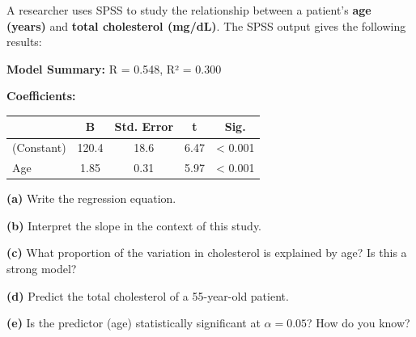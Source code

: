 \documentclass[
  12pt,
  letterpaper,
]{book}
\newcounter{none} %
\begin{document}
\begin{tcolorbox}[enhanced jigsaw, arc=.35mm, bottomrule=.15mm, bottomtitle=1mm, breakable, colback=white, colbacktitle=quarto-callout-caution-color!10!white, colframe=quarto-callout-caution-color-frame, coltitle=black, left=2mm, leftrule=.75mm, opacityback=0, opacitybacktitle=0.6, rightrule=.15mm, title={✏️ Exercise 2}, titlerule=0mm, toprule=.15mm, toptitle=1mm]

A researcher uses SPSS to study the relationship between a patient's
\textbf{age (years)} and \textbf{total cholesterol (mg/dL)}. The SPSS
output gives the following results:

\textbf{Model Summary:} R = 0.548, R² = 0.300

\textbf{Coefficients:}

{\def\LTcaptype{none} %
\begin{longtable}[]{@{}lcccc@{}}
\toprule\noalign{}
& B & Std. Error & t & Sig. \\
\midrule\noalign{}
\endhead
\bottomrule\noalign{}
\endlastfoot
(Constant) & 120.4 & 18.6 & 6.47 & \textless{} 0.001 \\
Age & 1.85 & 0.31 & 5.97 & \textless{} 0.001 \\
\end{longtable}
}

\textbf{(a)} Write the regression equation.

\textbf{(b)} Interpret the slope in the context of this study.

\textbf{(c)} What proportion of the variation in cholesterol is
explained by age? Is this a strong model?

\textbf{(d)} Predict the total cholesterol of a 55-year-old patient.

\textbf{(e)} Is the predictor (age) statistically significant at
\(\alpha = 0.05\)? How do you know?

\end{tcolorbox}
\end{document}
